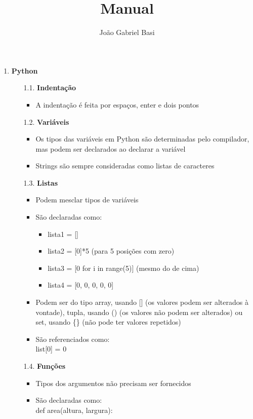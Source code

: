 \documentclass[12pt, a4paper]{article} %
\title{Manual}
\author{João Gabriel Basi}
\begin{document}
\maketitle
\Large
\begin{enumerate}
\item \textbf{Python}
\normalsize
\begin{enumerate}
\item[1.1.] \textbf{Indentação} 
\begin{itemize}
\item A indentação é feita por espaços, enter e dois pontos
\end{itemize}
\item[1.2.] \textbf{Variáveis} 
\begin{itemize}
\item Os tipos das variáveis em Python são determinadas pelo compilador, mas podem ser declarados ao declarar a variável
\item Strings são sempre consideradas como listas de caracteres
\end{itemize}
\item[1.3.] \textbf{Listas}
\begin{itemize}
\item Podem mesclar tipos de variáveis
\item São declaradas como: 
\begin{itemize}
\item lista1 = [] 
\item lista2 = [0]*5  (para 5 posições com zero)
\item lista3 = [0 for i in range(5)] (mesmo do de cima)
\item lista4 = [0, 0, 0, 0, 0]
\end{itemize}
\item Podem ser do tipo array, usando [] (os valores podem ser alterados à vontade), tupla, usando () (os valores não podem ser alterados) ou set, usando \{\} (não pode ter valores repetidos) 
\item São referenciados como: \\
list[0] = 0
\end{itemize}
\item[1.4.] \textbf{Funções}
\begin{itemize}
\item Tipos dos argumentos não precisam ser fornecidos
\item São declaradas como: \\
def area(altura, largura):\\[-0.5cm]


\end{itemize}
\end{enumerate}
\end{enumerate}
\end{document}
